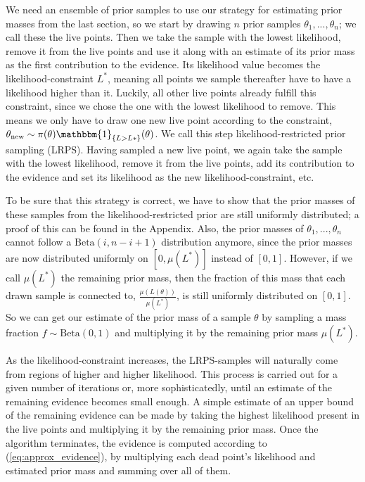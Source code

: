\documentclass[12pt, a4paper]{report}
\begin{document}
We need an ensemble of prior samples to use our strategy for estimating prior masses from the last section, so we start by drawing $n$ prior samples $\theta_1, ..., \theta_n$; we call these the live points.
Then we take the sample with the lowest likelihood, remove it from the live points and use it along with an estimate of its prior mass as the first contribution to the evidence.
Its likelihood value becomes the likelihood-constraint $L^*$, meaning all points we sample thereafter have to have a likelihood higher than it.
Luckily, all other live points already fulfill this constraint, since we chose the one with the lowest likelihood to remove.
This means we only have to draw one new live point according to the constraint, $\theta_{\textrm{new}} \sim \pi(\theta) \mathbbm{1}_{\{L > L*\}}(\theta)$.
We call this step likelihood-restricted prior sampling (LRPS).
Having sampled a new live point, we again take the sample with the lowest likelihood, remove it from the live points, add its contribution to the evidence and set its likelihood as the new likelihood-constraint, etc.

To be sure that this strategy is correct, we have to show that the prior masses of these samples from the likelihood-restricted prior are still uniformly distributed; a proof of this can be found in the Appendix.
Also, the prior masses of $\theta_1, ..., \theta_n$ cannot follow a $\textrm{Beta}(i, n-i+1)$ distribution anymore, since the prior masses are now distributed uniformly on $[0,\mu(L^*)]$ instead of $[0,1]$.
However, if we call $\mu(L^*)$ the remaining prior mass, then the fraction of this mass that each drawn sample is connected to, $\frac{\mu(L(\theta))}{\mu(L^*)}$, is still uniformly distributed on $[0,1]$.
So we can get our estimate of the prior mass of a sample $\theta$ by sampling a mass fraction $f \sim \textrm{Beta}(0,1)$ and multiplying it by the remaining prior mass $\mu(L^*)$.

As the likelihood-constraint increases, the LRPS-samples will naturally come from regions of higher and higher likelihood.
This process is carried out for a given number of iterations or, more sophisticatedly, until an estimate of the remaining evidence becomes small enough.
A simple estimate of an upper bound of the remaining evidence can be made by taking the highest likelihood present in the live points and multiplying it by the remaining prior mass.
Once the algorithm terminates, the evidence is computed according to (\ref{eq:approx_evidence}), by multiplying each dead point's likelihood and estimated prior mass and summing over all of them.
\end{document}
